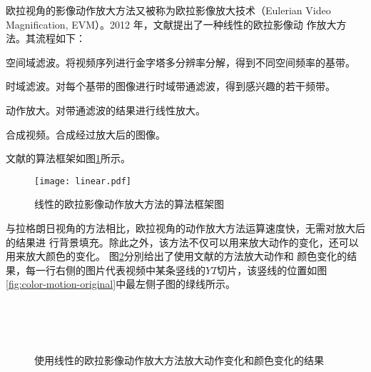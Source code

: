 欧拉视角的影像动作放大方法又被称为欧拉影像放大技术（Eulerian Video
Magnification, EVM）。2012 年，文献\cite{wu2012eulerian}提出了一种线性的欧拉影像动
作放大方法。其流程如下：

\begin{compactenum}
\item 空间域滤波。将视频序列进行金字塔多分辨率分解，得到不同空间频率的基带。
\item 时域滤波。对每个基带的图像进行时域带通滤波，得到感兴趣的若干频带。
\item 动作放大。对带通滤波的结果进行线性放大。
\item 合成视频。合成经过放大后的图像。
\end{compactenum}

文献\cite{wu2012eulerian}的算法框架如图\ref{fig:linear}所示。

\begin{figure}[htbp]
  \centering
  \texttt{[image: linear.pdf]}
  \caption{线性的欧拉影像动作放大方法的算法框架图}
  \label{fig:linear}
\end{figure}

与拉格朗日视角的方法相比，欧拉视角的动作放大方法运算速度快，无需对放大后的结果进
行背景填充。除此之外，该方法不仅可以用来放大动作的变化，还可以用来放大颜色的变化。
图\ref{fig:color-motion}分別给出了使用文献\cite{wu2012eulerian}的方法放大动作和
颜色变化的结果，每一行右侧的图片代表视频中某条竖线的$YT$切片，该竖线的位置如图
\ref{fig:color-motion-original}中最左侧子图的绿线所示。

\begin{figure}[htbp]
  \centering
    \\
    \\
    \\
  \caption{使用线性的欧拉影像动作放大方法放大动作变化和颜色变化的结果}
  \label{fig:color-motion}
\end{figure}


